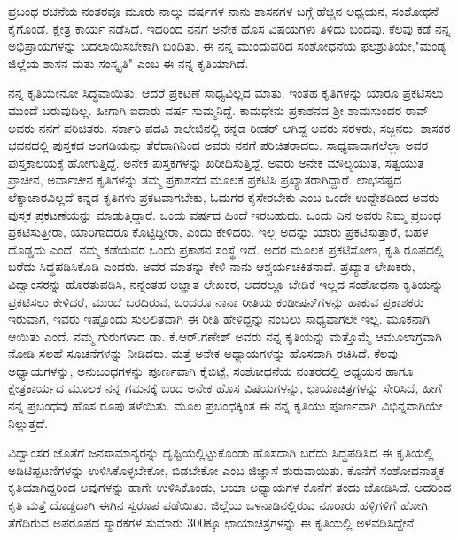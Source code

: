 ಪ್ರಬಂಧ ರಚನೆಯ ನಂತರವೂ ಮೂರು ನಾಲ್ಕು ವರ್ಷಗಳ ನಾನು ಶಾಸನಗಳ ಬಗ್ಗೆ ಹೆಚ್ಚಿನ ಅಧ್ಯಯನ, ಸಂಶೋಧನೆ ಕೈಗೊಂಡೆ. ಕ್ಷೇತ್ರ ಕಾರ್ಯ ನಡೆಸಿದೆ. ಇದರಿಂದ ನನಗೆ ಅನೇಕ ಹೊಸ ವಿಷಯಗಳು ತಿಳಿದು ಬಂದವು. ಕೆಲವು ಕಡೆ ನನ್ನ ಅಭಿಪ್ರಾಯಗಳನ್ನು ಬದಲಾಯಿಸಬೇಕಾಗಿ ಬಂದಿತು. ಈ ನನ್ನ ಮುಂದುವರಿದ ಸಂಶೋಧನೆಯ ಫಲಶ್ರುತಿಯೇ,"ಮಂಡ್ಯ ಜಿಲ್ಲೆಯ ಶಾಸನ ಮತು ಸಂಸ್ಕೃತಿ" ಎಂಬ ಈ ನನ್ನ ಕೃತಿಯಾಗಿದೆ.

ನನ್ನ ಕೃತಿಯೇನೋ ಸಿದ್ಧವಾಯಿತು. ಆದರೆ ಪ್ರಕಟಣೆ ಸಾಧ್ಯವಿಲ್ಲದ ಮಾತು. ಇಂತಹ ಕೃತಿಗಳನ್ನು ಯಾರೂ ಪ್ರಕಟಿಸಲು ಮುಂದೆ ಬರುವುದಿಲ್ಲ. ಹೀಗಾಗಿ ಐದಾರು ವರ್ಷ ಸುಮ್ಮನಿದ್ದೆ. ಕಾಮಧೇನು ಪ್ರಕಾಶನದ ಶ‍್ರೀ ಶಾಮಸುಂದರ ರಾವ್​ ಅವರು ನನಗೆ ಪರಿಚಿತರು. ಸರ್ಕಾರಿ ಪದವಿ ಕಾಲೇಜಿನಲ್ಲಿ ಕನ್ನಡ ರೀಡರ್​ ಆಗಿದ್ದ ಅವರು ಸರಳರು, ಸಜ್ಜನರು. ಶಾಸಕರ ಭವನದಲ್ಲಿ ಪುಸ್ತಕದ ಅಂಗಡಿಯನ್ನು ತೆರೆದಾಗಿನಿಂದ ಅವರು ನನಗೆ ಪರಿಚಿತರಾದರು. ಸಾಧ್ಯ\-ವಾದಾಗಲೆಲ್ಲಾ ಅವರ ಪುಸ್ತಕಾಲಯಕ್ಕೆ ಹೋಗುತ್ತಿದ್ದೆ. ಅನೇಕ ಪುಸ್ತಕಗಳನ್ನು ಖರೀದಿಸುತ್ತಿದ್ದೆ. ಅವರು ಅನೇಕ ಮೌಲ್ಯಯುತ, ಸತ್ವಯುತ ಪ್ರಾಚೀನ, ಅರ್ವಾಚೀನ ಕೃತಿಗಳನ್ನು ತಮ್ಮ ಪ್ರಕಾಶನದ ಮೂಲಕ ಪ್ರಕಟಿಸಿ ಪ್ರಖ್ಯಾತರಾಗಿದ್ದಾರೆ. ಲಾಭ\-ನಷ್ಟದ ಲೆಕ್ಕಾಚಾರವಿಲ್ಲದೆ ಕನ್ನಡ ಕೃತಿಗಳು ಪ್ರಕಟವಾಗಬೇಕು, ಓದುಗರ ಕೈಸೇರಬೇಕು ಎಂಬ ಒಂದೇ ಉದ್ದೇಶದಿಂದ ಅವರು ಪುಸ್ತಕ ಪ್ರಕಟಣೆಯನ್ನು ಮಾಡುತ್ತಿದ್ದಾರೆ. ಒಂದು ವರ್ಷದ ಹಿಂದೆ ಇರಬಹುದು. ಒಂದು ದಿನ ಅವರು ನಿಮ್ಮ ಪ್ರಬಂಧ ಪ್ರಕಟಿಸು\-ತ್ತೀರಾ, ಯಾರಿಗಾದರೂ ಕೊಟ್ಟಿದ್ದೀರಾ, ಎಂದು ಕೇಳಿದರು. ಇಲ್ಲ ಅದನ್ನು ಯಾರು ಪ್ರಕಟಿಸುತ್ತಾರೆ, ಬಹಳ ದೊಡ್ಡದು ಎಂದೆ. ನಮ್ಮ ಕಡೆಯವರ ಒಂದು ಪ್ರಕಾಶನ ಸಂಸ್ಥೆ ಇದೆ. ಅದರ ಮೂಲಕ ಪ್ರಕಟಿಸೋಣ, ಕೃತಿ ರೂಪದಲ್ಲಿ ಬರೆದು ಸಿದ್ಧಪಡಿಸಿಕೊಡಿ ಎಂದರು. ಅವರ ಮಾತನ್ನು ಕೇಳಿ ನಾನು ಆಶ್ಚರ್ಯಚಕಿತನಾದೆ. ಪ್ರಖ್ಯಾತ ಲೇಖಕರು, ವಿದ್ವಾಂಸರನ್ನು ಹೊರತುಪಡಿಸಿ, ನನ್ನಂತಹ ಅಜ್ಞಾತ ಲೇಖಕರ, ಅದರಲ್ಲೂ ಬೇಡಿಕೆ ಇಲ್ಲದ ಸಂಶೋಧನಾ ಕೃತಿಯನ್ನು ಪ್ರಕಟಿಸಲು ಕೇಳಿದರೆ, ಮುಂದೆ ಬರದಿರುವ, ಬಂದರೂ ನಾನಾ ರೀತಿಯ ಕಂಡೀಷನ್​ಗಳನ್ನು ಹಾಕುವ ಪ್ರಕಾಶಕರು ಇರುವಾಗ, ಇವರು ಇಷ್ಟೊಂದು ಸುಲಲಿತವಾಗಿ ಈ ರೀತಿ ಹೇಳಿದ್ದನ್ನು ನಂಬಲು ಸಾಧ್ಯವಾಗಲೇ ಇಲ್ಲ. ಮೂಕನಾಗಿ ಆಯಿತು ಎಂದೆ. ನಮ್ಮ ಗುರುಗಳಾದ ಡಾ. ಕೆ.ಆರ್​.ಗಣೇಶ್​ ಅವರು ನನ್ನ ಕೃತಿಯನ್ನು ಮತ್ತೊಮ್ಮೆ ಆಮೂಲಾಗ್ರವಾಗಿ ನೋಡಿ ಸಲಹೆ ಸೂಚನೆಗಳನ್ನು ನೀಡಿದರು. ಮತ್ತೆ ಅನೇಕ ಅಧ್ಯಾಯಗಳನ್ನು ಹೊಸದಾಗಿ ರಚಿಸಿದೆ. ಕೆಲವು ಅಧ್ಯಾಯಗಳನ್ನು, ಅನುಬಂಧಗಳನ್ನು ಪೂರ್ಣವಾಗಿ ಕೈಬಿಟ್ಟೆ, ಸಂಶೋಧನೆಯ ನಂತರದಲ್ಲಿ ಅಧ್ಯಯನ ಹಾಗೂ ಕ್ಷೇತ್ರಕಾರ್ಯದ ಮೂಲಕ ನನ್ನ ಗಮನಕ್ಕೆ ಬಂದ ಅನೇಕ ಹೊಸ ವಿಷಯಗಳನ್ನು, ಛಾಯಾಚಿತ್ರಗಳನ್ನು ಸೇರಿಸಿದೆ, ಹೀಗೆ ನನ್ನ ಪ್ರಬಂಧವು ಹೊಸ ರೂಪು ತಳೆಯಿತು. ಮೂಲ ಪ್ರಬಂಧಕ್ಕಿಂತ ಈ ನನ್ನ ಕೃತಿಯು ಪೂರ್ಣವಾಗಿ ವಿಭಿನ್ನವಾಗಿಯೇ ನಿಲ್ಲುತ್ತದೆ.

ವಿದ್ವಾಂಸರ ಜೊತೆಗೆ ಜನಸಾಮಾನ್ಯರನ್ನು ದೃಷ್ಟಿಯಲ್ಲಿಟ್ಟುಕೊಂಡು ಹೊಸದಾಗಿ ಬರೆದು ಸಿದ್ಧಪಡಿಸಿದ ಈ ಕೃತಿಯಲ್ಲಿ ಅಡಿಟಿಪ್ಪಟಣಿಗಳನ್ನು ಉಳಿಸಿಕೊಳ್ಳಬೇಕೋ, ಬಿಡಬೇಕೋ ಎಂಬ ಜಿಜ್ಞಾಸೆ ಶುರುವಾಯಿತು. ಕೊನೆಗೆ ಸಂಶೋಧನಾತ್ಮಕ ಕೃತಿಯಾಗಿದ್ದರಿಂದ ಅವುಗಳನ್ನು ಹಾಗೇ ಉಳಿಸಿಕೊಂಡು, ಆಯಾ ಅಧ್ಯಾಯಗಳ ಕೊನೆಗೆ ತಂದು ಜೋಡಿಸಿದೆ. ಅದರಿಂದ ಕೃತಿ ಮತ್ತೆ ದೊಡ್ಡದಾಗಿ ಈಗಿನ ಸ್ವರೂಪ ಪಡೆಯಿತು. ಜಿಲ್ಲೆಯ ಒಳನಾಡಿನಲ್ಲಿರುವ ನೂರಾರು ಹಳ್ಳಿಗಳಿಗೆ ಹೋಗಿ ತೆಗೆದಿರುವ ಅಪರೂಪದ ಸ್ಮಾರಕಗಳ ಸುಮಾರು 300ಕ್ಕೂ ಛಾಯಾಚಿತ್ರಗಳನ್ನು ಈ ಕೃತಿಯಲ್ಲಿ ಅಳವಡಿಸಿದ್ದೇನೆ.

